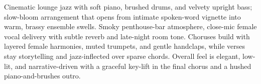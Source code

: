 

\begin{notes}
\end{notes}
\begin{style}
Cinematic lounge jazz with soft piano, brushed drums, and velvety upright bass; slow-bloom arrangement that opens from intimate spoken-word vignette into warm, brassy ensemble swells. %
Smoky penthouse-bar atmosphere, close-mic female vocal delivery with subtle reverb and late-night room tone. %
Choruses build with layered female harmonies, muted trumpets, and gentle handclaps, while verses stay storytelling and jazz-inflected over sparse chords. %
Overall feel is elegant, low-lit, and narrative-driven with a graceful key-lift in the final chorus and a hushed piano-and-brushes outro.
\end{style}
